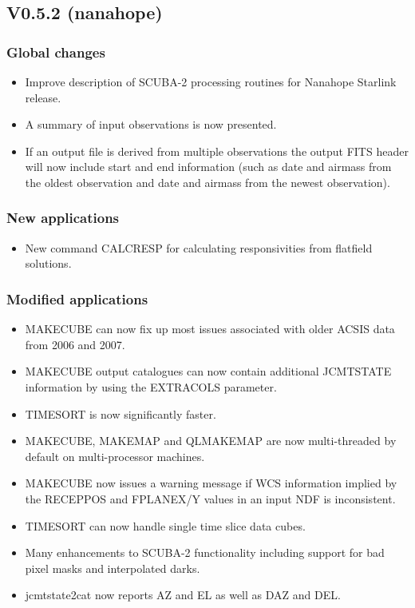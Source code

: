 \documentclass[twoside,11pt]{article}
\renewcommand{\_}{\texttt{\symbol{95}}}
\begin{document}
\subsection{V0.5.2 (nanahope)}

\subsubsection*{Global changes}
\begin{itemize}
\item Improve description of SCUBA-2 processing routines for Nanahope
  Starlink release.
\item A summary of input observations is now presented.
\item If an output file is derived from multiple observations the
  output FITS header will now include start and end information (such
  as date and airmass from the oldest observation and date and airmass
  from the newest observation).

\end{itemize}

\subsubsection*{New applications}
\begin{itemize}
  \item New command CALCRESP for calculating responsivities from
    flatfield solutions.
\end{itemize}

\subsubsection*{Modified applications}
\begin{itemize}
  \item MAKECUBE can now fix up most issues associated with older ACSIS data from 2006 and 2007.
  \item MAKECUBE output catalogues can now contain additional JCMTSTATE information by using the EXTRACOLS parameter.
  \item TIMESORT is now significantly faster.
  \item MAKECUBE, MAKEMAP and QLMAKEMAP are now multi-threaded by default on multi-processor machines.
  \item MAKECUBE now issues a warning message if WCS information implied by the RECEPPOS and FPLANEX/Y values in an input NDF is inconsistent.
  \item TIMESORT can now handle single time slice data cubes.
  \item Many enhancements to SCUBA-2 functionality including support for bad pixel masks and interpolated darks.
 \item jcmtstate2cat now reports AZ and EL as well as DAZ and DEL.
\end{itemize}
\end{document}
